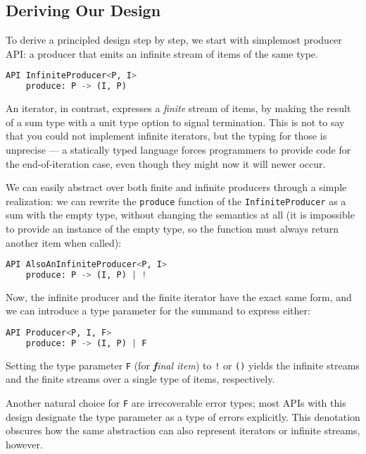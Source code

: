 \documentclass[sigplan,screen,10pt,review]{acmart}
\begin{document}
\subsection{Deriving Our Design}\label{derive}

To derive a principled design step by step, we start with simplemost producer API: a producer that emits an infinite stream of items of the same type.

\begin{lstlisting}[language=Python]
API InfiniteProducer<P, I>
    produce: P -> (I, P)
\end{lstlisting}

An iterator, in contrast, expresses a \textit{finite} stream of items, by making the result of a sum type with a unit type option to signal termination. This is not to say that you could not implement infinite iterators, but the typing for those is unprecise --- a statically typed language forces programmers to provide code for the end-of-iteration case, even though they might now it will newer occur.

We can easily abstract over both finite and infinite producers through a simple realization: we can rewrite the \texttt{produce} function of the \texttt{InfiniteProducer} as a sum with the empty type, without changing the semantics at all (it is impossible to provide an instance of the empty type, so the function must always return another item when called):

\begin{lstlisting}[language=Python]
API AlsoAnInfiniteProducer<P, I>
    produce: P -> (I, P) | !
\end{lstlisting}

Now, the infinite producer and the finite iterator have the exact same form, and we can introduce a type parameter for the summand to express either:

\begin{lstlisting}[language=Python]
API Producer<P, I, F>
    produce: P -> (I, P) | F
\end{lstlisting}

Setting the type parameter \texttt{F} (for \textit{\textbf{f}inal item}) to \texttt{!} or \texttt{()} yields the infinite streams and the finite streams over a single type of items, respectively.

Another natural choice for \texttt{F} are irrecoverable error types; most APIs with this design designate the type parameter as a type of errors explicitly. This denotation obscures how the same abstraction can also represent iterators or infinite streams, however.
\end{document}
